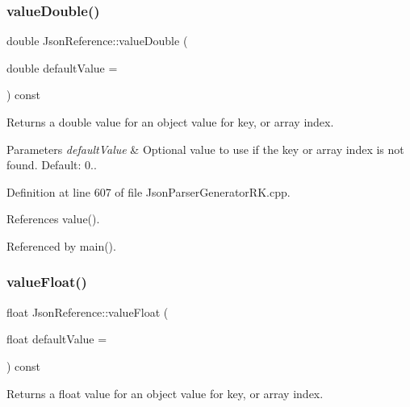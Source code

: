 \mbox{\label{class_json_reference_a670c3313ff8bc1399ce0a6efdad3b0db}} 
\subsubsection{\texorpdfstring{value\+Double()}{valueDouble()}}
{\footnotesize\ttfamily double Json\+Reference\+::value\+Double (\begin{DoxyParamCaption}\item[{double}]{default\+Value = {} }\end{DoxyParamCaption}) const}



Returns a double value for an object value for key, or array index. 


\begin{DoxyParams}{Parameters}
{\em default\+Value} & Optional value to use if the key or array index is not found. Default\+: 0.. \\
\hline
\end{DoxyParams}


Definition at line 607 of file Json\+Parser\+Generator\+R\+K.\+cpp.



References value().



Referenced by main().

\mbox{\label{class_json_reference_afa346d628f8ecb4ad2b7a67c7634a85c}} 
\subsubsection{\texorpdfstring{value\+Float()}{valueFloat()}}
{\footnotesize\ttfamily float Json\+Reference\+::value\+Float (\begin{DoxyParamCaption}\item[{float}]{default\+Value = {} }\end{DoxyParamCaption}) const}



Returns a float value for an object value for key, or array index. 


